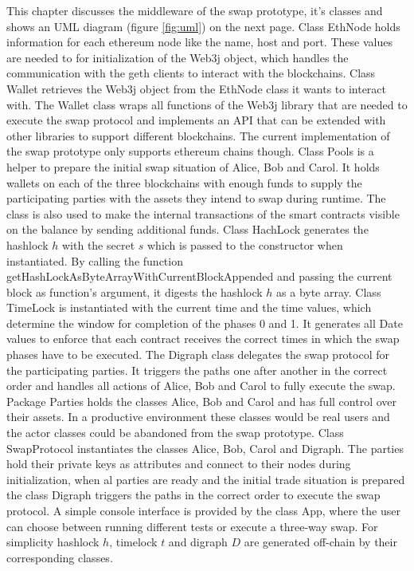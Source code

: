 This chapter discusses the middleware of the swap prototype, it's classes and shows an UML diagram (figure \ref{fig:uml}) on the next page. Class EthNode holds information for each ethereum node like the name, host and port. These values are needed to for initialization of the Web3j object, which handles the communication with the geth clients to interact with the blockchains. Class Wallet retrieves the Web3j object from the EthNode class it wants to interact with. The Wallet class wraps all functions of the Web3j library that are needed to execute the swap protocol and implements an API that can be extended with other libraries to support different blockchains. The current implementation of the swap prototype only supports ethereum chains though. Class Pools is a helper to prepare the initial swap situation of Alice, Bob and Carol. It holds wallets on each of the three blockchains with enough funds to supply the participating parties with the assets they intend to swap during runtime. The class is also used to make the internal transactions of the smart contracts visible on the balance by sending additional funds. Class HachLock generates the hashlock $h$ with the secret $s$ which is passed to the constructor when instantiated. By calling the function getHashLockAsByteArrayWithCurrentBlockAppended and passing the current block as function's argument, it digests the hashlock $h$ as a byte array. Class TimeLock is instantiated with the current time and the time values, which determine the window for completion of the phases 0 and 1. It generates all Date values to enforce that each contract receives the correct times in which the swap phases have to be executed. The Digraph class delegates the swap protocol for the participating parties. It triggers the paths one after another in  the correct order and handles all actions of Alice, Bob and Carol to fully execute the swap. Package Parties holds the classes Alice, Bob and Carol and has full control over their assets. In a productive environment these classes would be real users and the actor classes could be abandoned from the swap prototype. Class SwapProtocol instantiates the classes Alice, Bob, Carol and Digraph. The parties hold their private keys as attributes and connect to their nodes during initialization, when al parties are ready and the initial trade situation is prepared the class Digraph triggers the paths in the correct order to execute the swap protocol. A simple console interface is provided by the class App, where the user can choose between running different tests or execute a three-way swap. For simplicity hashlock $h$, timelock $t$ and digraph $D$ are generated off-chain by their corresponding classes.

